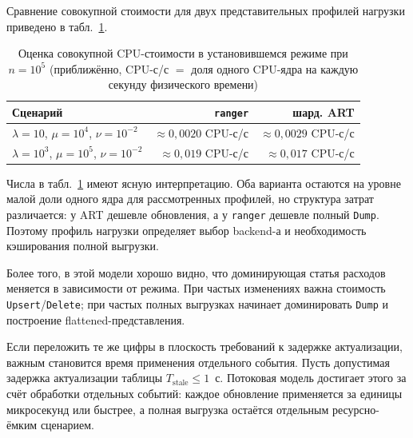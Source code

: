 Сравнение совокупной стоимости для двух представительных профилей
нагрузки приведено в табл.~\ref{tab:bench-cost}.

\begin{table}[ht]
\centering
\caption{Оценка совокупной CPU-стоимости в установившемся режиме при
$n = 10^5$ (приближённо, CPU-с/с $=$ доля одного CPU-ядра на каждую
секунду физического времени)}
\label{tab:bench-cost}
\small
\begin{tabular}{lrr}
\toprule
Сценарий & \texttt{ranger} & шард. ART \\
\midrule
$\lambda{=}10$, $\mu{=}10^4$, $\nu{=}10^{-2}$
	   & $\approx 0{,}0020$ CPU-с/с
	   & $\approx 0{,}0029$ CPU-с/с \\
$\lambda{=}10^3$, $\mu{=}10^5$, $\nu{=}10^{-2}$
	   & $\approx 0{,}019$ CPU-с/с
	   & $\approx 0{,}017$ CPU-с/с \\
\bottomrule
\end{tabular}
\end{table}

Числа в табл.~\ref{tab:bench-cost} имеют ясную интерпретацию. Оба
варианта остаются на уровне малой доли одного ядра для рассмотренных
профилей, но структура затрат различается: у ART дешевле обновления, а
у \texttt{ranger} дешевле полный \texttt{Dump}. Поэтому профиль нагрузки
определяет выбор backend-а и необходимость кэширования полной выгрузки.

Более того, в этой модели хорошо видно, что доминирующая статья расходов
меняется в зависимости от режима. При частых изменениях важна стоимость
\texttt{Upsert}/\texttt{Delete}; при частых полных выгрузках начинает
доминировать \texttt{Dump} и построение flattened-представления.

Если переложить те же цифры в плоскость требований к задержке
актуализации, важным становится время применения отдельного события.
Пусть допустимая задержка актуализации таблицы
$T_{\mathrm{stale}} \le 1$~с. Потоковая модель достигает этого за счёт
обработки отдельных событий: каждое обновление применяется за единицы
микросекунд или быстрее, а полная выгрузка остаётся отдельным
ресурсно-ёмким сценарием.

